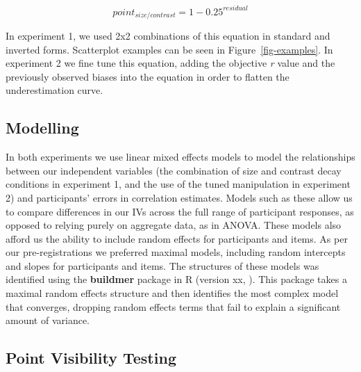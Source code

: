 \documentclass[manuscript, review, anonymous, screen]{acmart}
\begin{document}
\begin{equation}
  point_{size/contrast} = 1 - 0.25^{residual}
\end{equation}

In experiment 1, we used 2x2 combinations of this equation in standard
and inverted forms. Scatterplot examples can be seen in
Figure~\ref{fig-examples}. In experiment 2 we fine tune this equation,
adding the objective \emph{r} value and the previously observed biases
into the equation in order to flatten the underestimation curve.

\hypertarget{sec-gen-modelling}{%
\subsection{Modelling}\label{sec-gen-modelling}}

In both experiments we use linear mixed effects models to model the
relationships between our independent variables (the combination of size
and contrast decay conditions in experiment 1, and the use of the tuned
manipulation in experiment 2) and participants' errors in correlation
estimates. Models such as these allow us to compare differences in our
IVs across the full range of participant responses, as opposed to
relying purely on aggregate data, as in ANOVA. These models also afford
us the ability to include random effects for participants and items. As
per our pre-registrations we preferred maximal models, including random
intercepts and slopes for participants and items. The structures of
these models was identified using the \textbf{buildmer} package in R
(version xx, \citet{voeten_buildmer}). This package takes a maximal
random effects structure and then identifies the most complex model that
converges, dropping random effects terms that fail to explain a
significant amount of variance.

\hypertarget{sec-VT}{%
\subsection{Point Visibility Testing}\label{sec-VT}}
\end{document}
